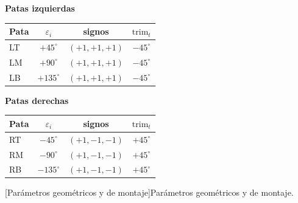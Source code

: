 \begin{center}
    \setlength{\tabcolsep}{5pt}
    \renewcommand{\arraystretch}{1.05}
    \begin{minipage}[t]{0.88\textwidth}
        \centering
        \small
        \captionsetup{type=table, justification=centering, skip=3pt}
        \begin{minipage}[t]{0.45\textwidth}
            \centering
            \scriptsize\textbf{Patas izquierdas}\\[0.35em]
            \begin{tabular}{@{}lccc@{}}
                \toprule
                \textbf{Pata} & \textbf{$\varepsilon_i$} & \textbf{signos} & \textbf{$\text{trim}_{t}$} \\
                \midrule
                LT & $+45^\circ$  & $(+1,+1,+1)$ & $-45^\circ$ \\
                LM & $+90^\circ$  & $(+1,+1,+1)$ & $-45^\circ$ \\
                LB & $+135^\circ$ & $(+1,+1,+1)$ & $-45^\circ$ \\
                \bottomrule
            \end{tabular}
        \end{minipage}
        \hfill
        \begin{minipage}[t]{0.45\textwidth}
            \centering
            \scriptsize\textbf{Patas derechas}\\[0.35em]
            \begin{tabular}{@{}lccc@{}}
                \toprule
                \textbf{Pata} & \textbf{$\varepsilon_i$} & \textbf{signos} & \textbf{$\text{trim}_{t}$} \\
                \midrule
                RT & $-45^\circ$  & $(+1,-1,-1)$ & $+45^\circ$ \\
                RM & $-90^\circ$  & $(+1,-1,-1)$ & $+45^\circ$ \\
                RB & $-135^\circ$ & $(+1,-1,-1)$ & $+45^\circ$ \\
                \bottomrule
            \end{tabular}
        \end{minipage}

        \vspace{0.4em}
        [Parámetros geométricos y de montaje]{Parámetros geométricos y de montaje.}
        \label{tab:parametros_pata}
    \end{minipage}
\end{center}

